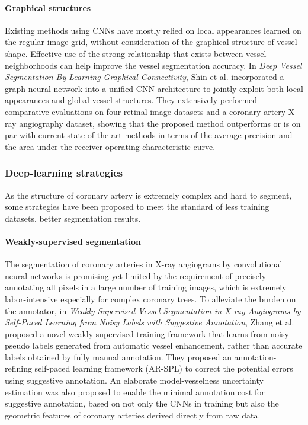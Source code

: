 \documentclass[lang=cn,11pt,a4paper,cite=numbers]{elegantpaper}
\begin{document}
\paragraph{Graphical structures}

Existing methods using CNNs have mostly relied on local appearances learned on the regular image grid, without consideration of the graphical structure of vessel shape. Effective use of the strong relationship that exists between vessel neighborhoods can help improve the vessel segmentation accuracy. In \emph{Deep Vessel Segmentation By Learning Graphical Connectivity}\cite{21}, Shin et al. incorporated a graph neural network into a unified CNN architecture to jointly exploit both local appearances and global vessel structures. They extensively performed comparative evaluations on four retinal image datasets and a coronary artery X-ray angiography dataset, showing that the proposed method outperforms or is on par with current state-of-the-art methods in terms of the average precision and the area under the receiver operating characteristic curve.

\subsubsection{Deep-learning strategies}

As the structure of coronary artery is extremely complex and hard to segment, some strategies have been proposed to meet the standard of less training datasets, better segmentation results.

\paragraph{Weakly-supervised segmentation}

The segmentation of coronary arteries in X-ray angiograms by convolutional neural networks is promising yet limited by the requirement of precisely annotating all pixels in a large number of training images, which is extremely labor-intensive especially for complex coronary trees. To alleviate the burden on the annotator, in \emph{Weakly Supervised Vessel Segmentation in X-ray Angiograms by Self-Paced Learning from Noisy Labels with Suggestive Annotation}\cite{22}, Zhang et al. proposed a novel weakly supervised training framework that learns from noisy pseudo labels generated from automatic vessel enhancement, rather than accurate labels obtained by fully manual annotation. They proposed an annotation-refining self-paced learning framework (AR-SPL) to correct the potential errors using suggestive annotation. An elaborate model-vesselness uncertainty estimation was also proposed to enable the minimal annotation cost for suggestive annotation, based on not only the CNNs in training but also the geometric features of coronary arteries derived directly from raw data.
\end{document}
